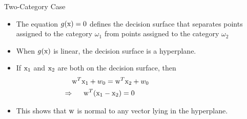 \begin{frame}{Two-Category Case}
\begin{itemize}
\item The equation $g({\rm x}) = 0$ defines the decision surface that separates points assigned to the category ${\omega_1}$ from points assigned to the category ${\omega}_2$
\item When $g({\rm x})$ is linear, the decision surface is a hyperplane.
\item If ${\rm x}_1$ and ${\rm x}_2$ are both on the decision
surface, then
\begin{align}
{\rm w}^T{\rm x}_1+w_0={\rm w}^T{\rm x}_2+w_0~~~~~~~~~~~~~~~~~~~~~~~~~~~ \nonumber\\
\Rightarrow ~~~~{\rm w}^T({\rm x}_1-{\rm x}_2)=0~~~~~~~~~~~~~~~~~~~~~~~~~~~~~~~~~\nonumber
\end{align}
\vspace{1cm}
\item This shows that ${\rm w}$ is normal to any vector lying in the hyperplane.
\end{itemize}
\end{frame}

